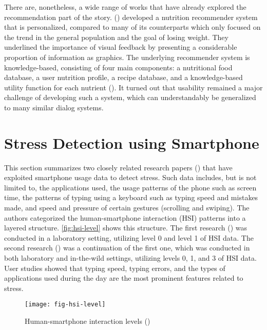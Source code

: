\noindent There are, nonetheless, a wide range of works that have already explored the recommendation part of the story. \citeauthor{18_nutrilize} (\citeyear{18_nutrilize}) developed a nutrition recommender system that is personalized, compared to many of its counterparts which only focused on the trend in the general population and the goal of losing weight. They underlined the importance of visual feedback by presenting a considerable proportion of information as graphics. The underlying recommender system is knowledge-based, consisting of four main components: a nutritional food database, a user nutrition profile, a recipe database, and a knowledge-based utility function for each nutrient (\cite{18_nutrilize}). It turned out that usability remained a major challenge of developing such a system, which can understandably be generalized to many similar dialog systems.

\section{Stress Detection using Smartphone}
This section summarizes two closely related research papers (\cite{20_ciman, 21_ciman_2}) that have exploited smartphone usage data to detect stress. Such data includes, but is not limited to, the applications used, the usage patterns of the phone such as screen time, the patterns of typing using a keyboard such as typing speed and mistakes made, and speed and pressure of certain gestures (scrolling and swiping). The authors categorized the human-smartphone interaction (HSI) patterns into a layered structure. \autoref{fig:hsi-level} shows this structure. The first research (\cite{20_ciman}) was conducted in a laboratory setting, utilizing level 0 and level 1 of HSI data. The second research (\cite{21_ciman_2}) was a continuation of the first one, which was conducted in both laboratory and in-the-wild settings, utilizing levels 0, 1, and 3 of HSI data. User studies showed that typing speed, typing errors, and the types of applications used during the day are the most prominent features related to stress.

\begin{figure}[ht]
  \centering
  \texttt{[image: fig-hsi-level]}
  \caption{Human-smartphone interaction levels (\cite{21_ciman_2})}
  \label{fig:hsi-level}
\end{figure}


